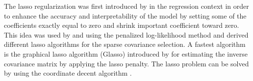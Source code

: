 The lasso regularization was first introduced by \cite{tibshirani1996regression} in the regression context in order to enhance the accuracy and interpretability of the model by setting some of the coefficients exactly equal to zero and shrink important coefficient toward zero. This idea was used by \cite{yuan2007model} and \cite{d2008first} using the penalized log-likelihood method and derived different lasso algorithms for the sparse covariance selection. A fastest algorithm is the graphical lasso algorithm (Glasso) introduced by \cite{friedman2008sparse} for estimating the inverse covariance matrix by applying the lasso penalty. The lasso problem can be solved by using the coordinate decent algorithm \citep{friedman2007pathwise}.  

